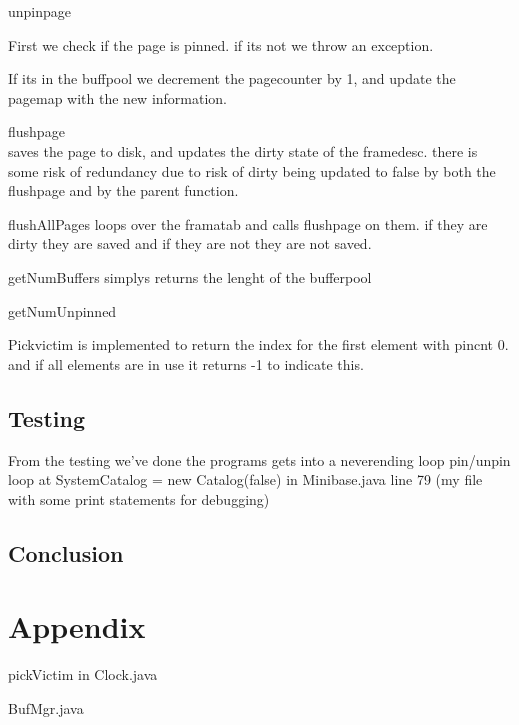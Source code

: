 \documentclass[a4paper,10pt,titlepage]{report}
\begin{document}
unpinpage

First we check if the page is pinned. if its not we throw an exception.

If its in the buffpool we decrement the pagecounter by 1, and update the pagemap with the new information.

\vspace{10mm}



flushpage\\
saves the page to disk, and updates the dirty state of the framedesc. there is some risk of redundancy due to risk of dirty being updated to false by both the flushpage and by the parent function.

\vspace{10mm}
flushAllPages loops over the framatab and calls flushpage on them. if they are dirty they are saved and if they are not they are not saved.

\vspace{10mm}

getNumBuffers simplys returns the lenght of the bufferpool

\vspace{10mm}

getNumUnpinned

\vspace{10mm}

Pickvictim is implemented to return the index for the first element with pincnt 0. and if all elements are in use it returns -1 to indicate this.


\subsection{Testing}
From the testing we've done the programs gets into a neverending loop pin/unpin loop at SystemCatalog = new Catalog(false) in Minibase.java line 79 (my file with some print statements for debugging)
\subsection{Conclusion}


\newpage
\section{Appendix}
pickVictim in Clock.java


BufMgr.java

\end{document}

